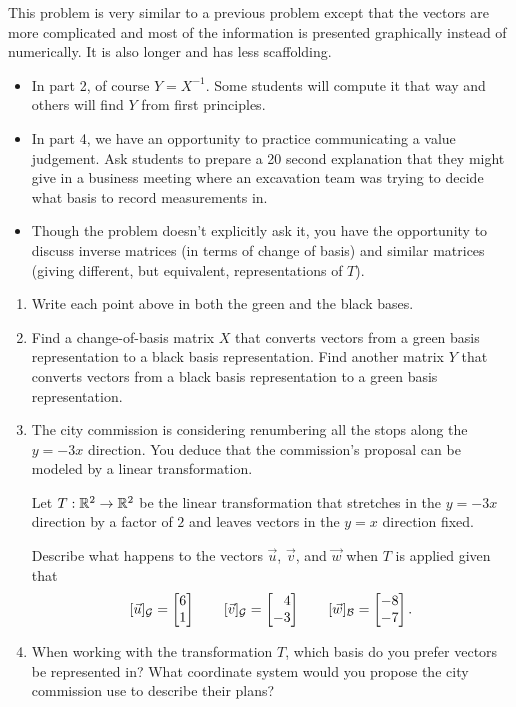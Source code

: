 \documentclass{workbook}
\begin{document}
\begin{iola}
\begin{slide}
	\begin{annotation}
		\begin{notes}
			This problem is very similar to a previous problem except that
			the vectors are more complicated and most of the information
			is presented graphically instead of numerically. It is also
			longer and has less scaffolding.

			\begin{itemize}
				\item In part 2, of course $Y=X^{-1}$. Some students will
					compute it that way and others will find $Y$ from
					first principles.
				\item In part 4, we have an opportunity to practice communicating
					a value judgement. Ask students to prepare a 20 second explanation
					that they might give in a business meeting where an excavation
					team was trying to decide what basis to record measurements
					in.
				\item Though the problem doesn't explicitly ask it, you have the opportunity
					to discuss inverse matrices (in terms of change of basis) and similar
					matrices (giving different, but equivalent, representations of $T$).
			\end{itemize}
		\end{notes}
	\end{annotation}


\begin{enumerate}
	\item Write each point above in both the green and the black bases.
	\item Find a change-of-basis matrix $X$ that converts vectors from
		a green basis representation to a black basis representation. Find
		another matrix $Y$ that converts vectors from a black basis representation
		to a green basis representation.
	\item The city commission is considering renumbering all the stops along the $y=-3x$ direction.
		You deduce that the commission's proposal can be modeled by a linear transformation.

		Let $T:\mathbb{R}^2\to\mathbb{R}^2$ be the linear transformation that stretches in the $y=-3x$ direction
		by a factor of $2$ and leaves vectors in the $y=x$ direction fixed.

		Describe what happens to the vectors $\vec u$, $\vec v$, and $\vec w$ when
		$T$ is applied given that
		\[
			[\vec u]_{\mathcal G} = \mat{6\\1} \qquad
			[\vec v]_{\mathcal G} = \mat{4\\-3} \qquad
			[\vec w]_{\mathcal B} = \mat{-8\\-7}.
		\]
	\item When working with the transformation $T$, which basis do you prefer vectors be
		represented in? What coordinate system would you propose the city commission
		use to describe their plans?
\end{enumerate}
\end{slide}
\end{iola}
\end{document}
